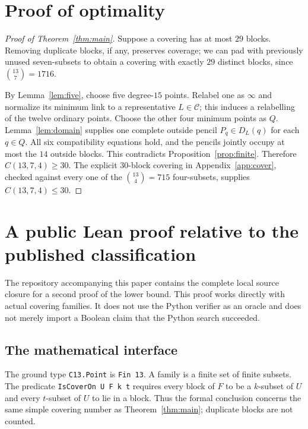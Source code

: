 \documentclass[11pt]{article}
\newcommand{\bin}[2]{\binom{#1}{#2}}
\newcommand{\cat}{\mathcal C}
\theoremstyle{definition}
\theoremstyle{remark}
\begin{document}
\section{Proof of optimality}
\begin{proof}[Proof of Theorem~\ref{thm:main}]
Suppose a covering has at most $29$ blocks. Removing duplicate blocks,
if any, preserves coverage; we can pad with previously unused
seven-subsets to obtain a covering with exactly $29$ distinct blocks,
since $\bin{13}{7}=1716$.

By Lemma~\ref{lem:five}, choose five degree-$15$ points. Relabel one
as $\infty$ and normalize its minimum link to a representative
$L\in\cat$; this induces a relabelling of the twelve ordinary points.
Choose the other four minimum points as $Q$.
Lemma~\ref{lem:domain} supplies one complete outside pencil
$P_q\in D_L(q)$ for each $q\in Q$. All six compatibility equations
hold, and the pencils jointly occupy at most the $14$ outside blocks.
This contradicts Proposition~\ref{prop:finite}. Therefore
$C(13,7,4)\ge30$. The explicit $30$-block covering in
Appendix~\ref{app:cover}, checked against every one of the
$\bin{13}{4}=715$ four-subsets, supplies $C(13,7,4)\le30$.
\end{proof}

\section{A public Lean proof relative to the published classification}
\label{sec:lean}
The repository accompanying this paper contains the complete local
source closure for a second proof of the lower bound. This proof
works directly with actual covering families. It does not use the
Python verifier as an oracle and does not merely import a Boolean
claim that the Python search succeeded.

\subsection{The mathematical interface}
The ground type \texttt{C13.Point} is \texttt{Fin 13}. A family is
a finite set of finite subsets. The predicate
\texttt{IsCoverOn U F k t} requires every block of $F$ to be a
$k$-subset of $U$ and every $t$-subset of $U$ to lie in a block.
Thus the formal conclusion concerns the same simple covering
number as Theorem~\ref{thm:main}; duplicate blocks are not counted.
\end{document}
